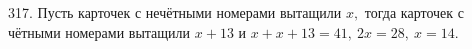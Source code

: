 317. Пусть карточек с нечётными номерами вытащили $x,$ тогда карточек с чётными номерами вытащили $x+13$ и $x+x+13=41,\ 2x=28,\ x=14.$\\
